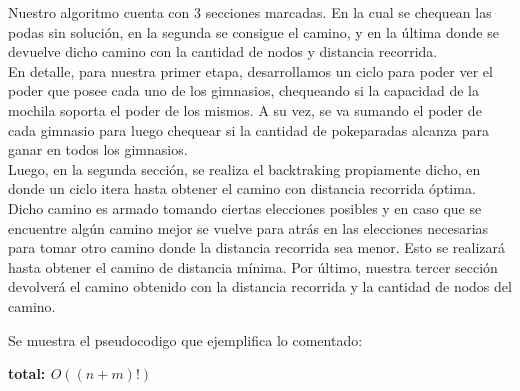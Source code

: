 Nuestro algoritmo cuenta con 3 secciones marcadas. En la cual se chequean las podas sin soluci\'on, en la segunda se consigue el camino, y en la \'ultima donde se devuelve dicho camino con la cantidad de nodos y distancia recorrida.\\
En detalle, para nuestra primer etapa, desarrollamos un ciclo para poder ver el poder que posee cada uno de los gimnasios, chequeando si la capacidad de la mochila soporta el poder de los mismos. A su vez, se va sumando el poder de cada gimnasio para luego chequear si la cantidad de pokeparadas alcanza para ganar en todos los gimnasios.\\
Luego, en la segunda secci\'on, se realiza el backtraking propiamente dicho, en donde un ciclo itera hasta obtener el camino con distancia recorrida \'optima. Dicho camino es armado tomando ciertas elecciones posibles y en caso que se encuentre alg\'un camino mejor se vuelve para atrás en las elecciones necesarias para tomar otro camino donde la distancia recorrida sea menor. Esto se realizar\'a hasta obtener el camino de distancia m\'inima.
Por \'ultimo, nuestra tercer secci\'on devolver\'a el camino obtenido con la distancia recorrida y la cantidad de nodos del camino.

Se muestra el pseudocodigo que ejemplifica lo comentado:

\begin{algorithm}[H]
		
		\textbf{\hfill total: $O((n+m)!)$}\\
\end{algorithm}

